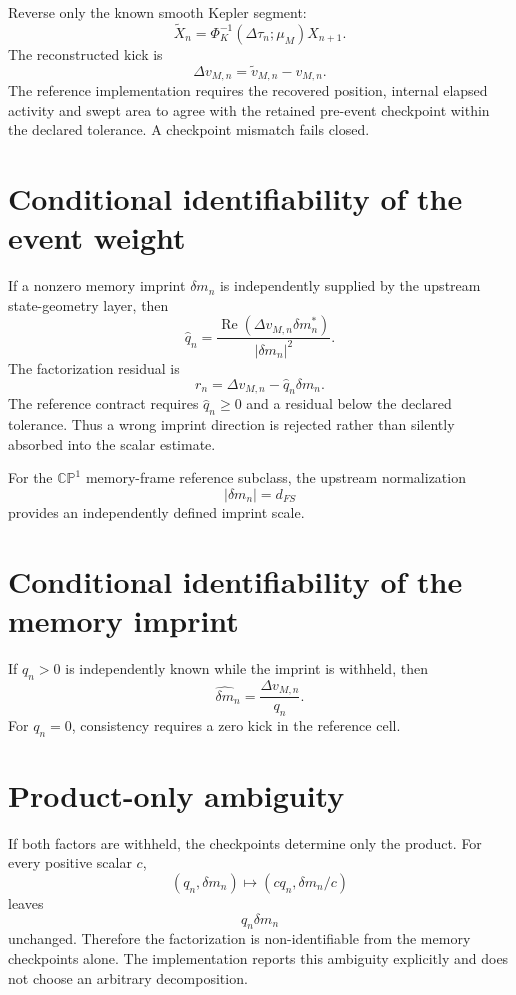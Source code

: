 \documentclass[11pt]{book}
\begin{document}
Reverse only the known smooth Kepler segment:
\[
\widetilde X_n
=\Phi_K^{-1}(\Delta\tau_n;\mu_M)X_{n+1}.
\]
The reconstructed kick is
\[
\boxed{
\Delta v_{M,n}
=\widetilde v_{M,n}-v_{M,n}.
}
\]
The reference implementation requires the recovered position, internal elapsed activity and swept area to agree with the retained pre-event checkpoint within the declared tolerance. A checkpoint mismatch fails closed.

\section{Conditional identifiability of the event weight}

If a nonzero memory imprint \(\delta m_n\) is independently supplied by the upstream state-geometry layer, then
\[
\boxed{
\widehat q_n
=
\frac{\operatorname{Re}(\Delta v_{M,n}\delta m_n^*)}
{|\delta m_n|^2}.
}
\]
The factorization residual is
\[
\boxed{
r_n
=\Delta v_{M,n}-\widehat q_n\delta m_n.
}
\]
The reference contract requires \(\widehat q_n\ge0\) and a residual below the declared tolerance. Thus a wrong imprint direction is rejected rather than silently absorbed into the scalar estimate.

For the \(\mathbb{CP}^1\) memory-frame reference subclass, the upstream normalization
\[
|\delta m_n|=d_{FS}
\]
provides an independently defined imprint scale.

\section{Conditional identifiability of the memory imprint}

If \(q_n>0\) is independently known while the imprint is withheld, then
\[
\boxed{
\widehat{\delta m}_n
=\frac{\Delta v_{M,n}}{q_n}.
}
\]
For \(q_n=0\), consistency requires a zero kick in the reference cell.

\section{Product-only ambiguity}

If both factors are withheld, the checkpoints determine only the product. For every positive scalar \(c\),
\[
\boxed{
(q_n,\delta m_n)
\mapsto
(cq_n,\delta m_n/c)
}
\]
leaves
\[
q_n\delta m_n
\]
unchanged. Therefore the factorization is non-identifiable from the memory checkpoints alone. The implementation reports this ambiguity explicitly and does not choose an arbitrary decomposition.
\end{document}
